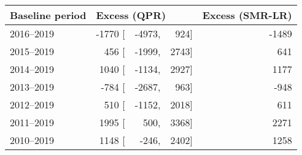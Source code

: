 \begin{tabular}{lrrrr} 
\hline
Baseline period & \multicolumn{3}{l}{Excess (QPR)} & Excess (SMR-LR) \\ 
\hline
2016--2019    &    -1770 [ & -4973, & 924]   &   -1489 \\ 
2015--2019    &    456 [ & -1999, & 2743]   &   641 \\ 
2014--2019    &    1040 [ & -1134, & 2927]   &   1177 \\ 
2013--2019    &    -784 [ & -2687, & 963]   &   -948 \\ 
2012--2019    &    510 [ & -1152, & 2018]   &   611 \\ 
2011--2019    &    1995 [ & 500, & 3368]   &   2271 \\ 
2010--2019    &    1148 [ & -246, & 2402]   &   1258 \\ 
\hline
\end{tabular}
